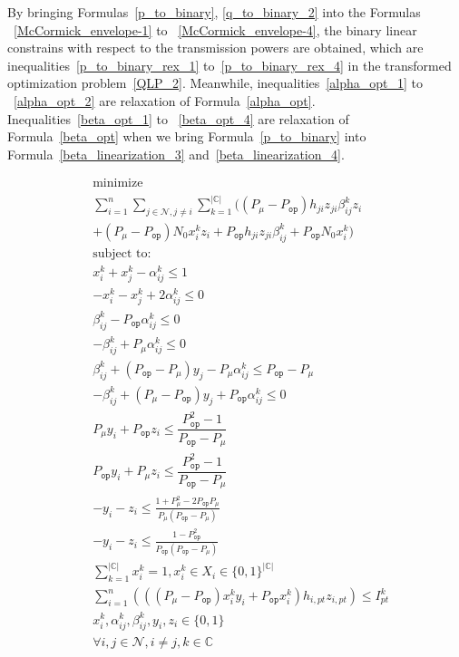 \documentclass[times]{ettauth}
\theoremstyle{mytheoremstyle}
\theoremstyle{mytheoremstyle}
\theoremstyle{mytheoremstyle}
\begin{document}
	
	By bringing Formulas~\ref{p_to_binary}, \ref{q_to_binary_2} into the Formulas ~\ref{McCormick_envelope-1} to ~\ref{McCormick_envelope-4}, the binary linear constrains with respect to the transmission powers are obtained, which are inequalities~\ref{p_to_binary_rex_1} to~\ref{p_to_binary_rex_4} in the transformed optimization problem~\ref{QLP_2}.
Meanwhile, inequalities~\ref{alpha_opt_1} to ~\ref{alpha_opt_2} are relaxation of Formula~\ref{alpha_opt}.
Inequalities~\ref{beta_opt_1} to ~\ref{beta_opt_4} are relaxation of Formula~\ref{beta_opt} when we bring Formula~\ref{p_to_binary} into Formula~\ref{beta_linearization_3} and~\ref{beta_linearization_4}.

			\begin{align}
			\label{scheme2optimizaiton}
			& \underset{}{\text{minimize}}\\
			&\sum\limits^{n}_{i=1}\sum\limits_{j\in\mathcal{N}, j\neq i}\sum\limits_{k=1}^{|\mathbb{C}|} ((P_\mu - P_{\mathtt{op}})h_{ji} z_{ji} \beta_{ij}^k z_i  \\
			&  + (P_\mu - P_{\mathtt{op}})N_0  x_i^k z_i + P_{\mathtt{op}}h_{ji} z_{ji} \beta_{ij}^k +  P_{\mathtt{op}}N_0x_i^k)\\
			& \text{subject to:} \\
			& x_i^k + x_j^k  - \alpha_{ij}^k\leq 1 \label{alpha_opt_1}\\
			& - x_i^k - x_j^k + 2 \alpha_{ij}^k \leq 0 \label{alpha_opt_2} \\
			& \beta_{ij}^k - P_{\mathtt{op}} \alpha_{ij}^k \leq 0 \label{beta_opt_1}\\
			& - \beta_{ij}^k + P_\mu \alpha_{ij}^k \leq 0 \label{beta_opt_2}\\
			& \beta_{ij}^k + (P_{\mathtt{op}} - P_\mu)y_j - P_\mu \alpha_{ij}^k \leq P_{\mathtt{op}}- P_\mu \label{beta_opt_3}\\	
			& -\beta_{ij}^k + (P_\mu - P_{\mathtt{op}})y_j + P_{\mathtt{op}} \alpha_{ij}^k \leq 0 \label{beta_opt_4}\\		
			& P_\mu y_i + P_{\mathtt{op}} z_i  \leq \dfrac{P_{\mathtt{op}}^2-1}{P_{\mathtt{op}} - P_\mu} \label{p_to_binary_rex_1}\\	
			& P_{\mathtt{op}} y_i + P_\mu z_i  \leq \dfrac{P_{\mathtt{op}}^2-1}{P_{\mathtt{op}} - P_\mu}\label{p_to_binary_rex_2}\\
			& -y_i - z_i  \leq \frac{1+P_\mu^2-2P_{\mathtt{op}}P_\mu  }{P_\mu (P_{\mathtt{op}} - P_\mu)} \label{p_to_binary_rex_3}\\
			& -y_i - z_i  \leq \frac{1- P_{\mathtt{op}}^2}{P_{\mathtt{op}}(P_{\mathtt{op}} - P_\mu) }\label{p_to_binary_rex_4}\\		
			& \sum\limits_{k=1}^{|\mathbb{C}|}x_i^k=1, x_i^k\in X_i\in \{0,1\}^{|\mathbb{C}|}\\
			& \sum\limits^{n}_{i=1} (((P_\mu - P_{\mathtt{op}})x_i^k y_i + P_{\mathtt{op}}x_i^k)h_{i,pt} z_{i,pt}) \leq  I^k_{pt}\\
			& x_i^k, \alpha_{ij}^k, \beta_{ij}^k, y_i, z_i \in \{0,1\}\\
			& \forall i, j\in \mathcal{N}, i\neq j, k\in \mathbb{C}
			\end{align}
\end{document}
